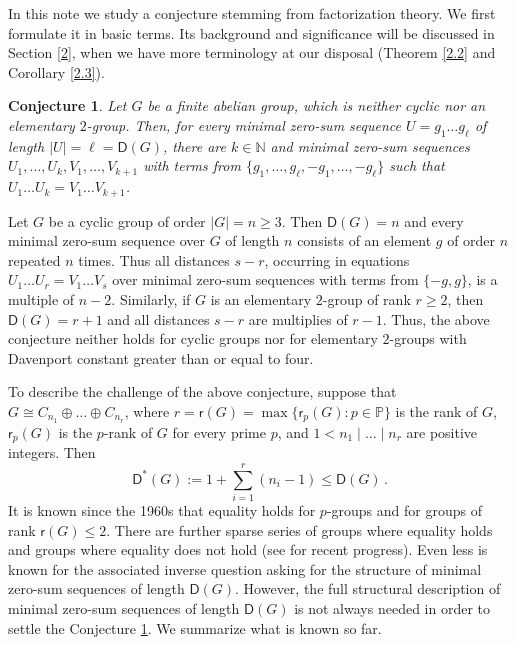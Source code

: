 \documentclass[a4paper,10pt]{amsart}
\theoremstyle{plain}
\newtheorem{conjecture}[theorem]{\bf Conjecture}
\theoremstyle{definition}
\newcommand{\N}{\mathbb N}
\numberwithin{equation}{section}
\begin{document}
In this note we study a conjecture stemming from factorization theory. We first formulate it in basic terms. Its background and significance will be discussed in Section \ref{2}, when we have more terminology at our disposal (Theorem \ref{2.2} and Corollary \ref{2.3}).

\smallskip
\noindent
\begin{conjecture} \label{1.1}
 Let $G$ be a finite abelian group, which is neither cyclic nor an elementary $2$-group.  Then, for every minimal zero-sum sequence $U = g_1 \ldots g_{\ell}$ of length $|U| = \ell = \mathsf D (G)$,  there are $k \in \N$ and minimal zero-sum sequences $U_1, \ldots, U_k, V_1, \ldots, V_{k+1}$ with terms from $\{g_1, \ldots, g_{\ell}, -g_1, \ldots, - g_{\ell} \}$ such that $U_1 \ldots U_k = V_1 \ldots V_{k+1}$.
\end{conjecture}

\smallskip
Let $G$ be a cyclic group of order $|G|=n \ge 3$. Then $\mathsf D (G)=n$ and every minimal zero-sum sequence over $G$ of length $n$ consists of an element $g$ of order $n$ repeated $n$ times. Thus all distances $s-r$, occurring in equations $U_1 \ldots U_r = V_1 \ldots V_s$ over minimal zero-sum sequences with terms from $\{-g, g\}$, is a multiple of $n-2$. Similarly, if $G$ is an elementary $2$-group of rank $r \ge 2$, then $\mathsf D (G)=r+1$ and all distances $s-r$ are multiplies of $r-1$. Thus,  the above conjecture neither holds for cyclic groups  nor for elementary $2$-groups with Davenport constant greater than or equal to four.

\smallskip
To describe the challenge of the above conjecture, suppose that $G \cong C_{n_1} \oplus \ldots \oplus C_{n_r}$, where $r = \mathsf r (G) = \max \{\mathsf r_p (G) \colon p \in \mathbb P \}$ is the rank of $G$, $\mathsf r_p (G)$ is the $p$-rank of $G$ for every prime $p$,  and $1 < n_1 \mid \ldots \mid n_r$ are positive integers. Then
\begin{equation} \label{davenport}
\mathsf D^* (G) := 1 + \sum_{i=1}^r (n_i-1) \le \mathsf D (G) \,.
\end{equation}
It is known since the 1960s that equality holds for $p$-groups and for groups of rank $\mathsf r (G) \le 2$. There are further sparse series of groups where equality holds and groups where equality does not hold (see \cite{Bh-SP07a, Gi18a, Gi-Sc19a, Li20a} for recent progress). Even less is known for the associated inverse question asking for the structure of minimal zero-sum sequences of length $\mathsf D (G)$. However,  the full structural description of minimal zero-sum sequences of length $\mathsf D (G)$ is not always needed in order to settle the Conjecture \ref{1.1}. We summarize what is known so far.
\end{document}
